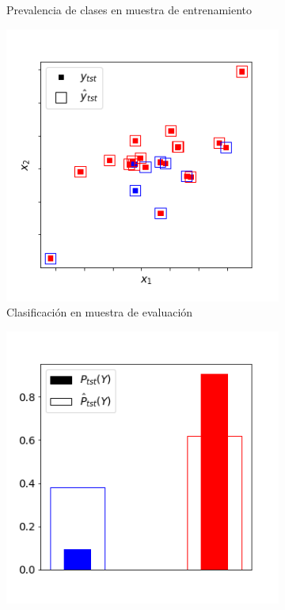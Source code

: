 \begin{figure}[h]
\begin{subfigure}[t]{0.4\textwidth}
        \caption{Prevalencia de clases en muestra de
        entrenamiento}\label{cambios:prevalencia_tr}
    \end{subfigure}
    \medskip
    \begin{subfigure}[t]{0.4\textwidth}
        \centering
        \includegraphics[width=\textwidth]{../plots_teoria/cambios_test_scatterplot.png}
        \caption{Clasificación en muestra de
        evaluación}\label{cambios:clasificacion_tst}
    \end{subfigure}
    \hfill
    \begin{subfigure}[t]{0.4\textwidth}
        \centering
        \includegraphics[width=\textwidth]{../plots_teoria/cambios_test_barplot.png}

\end{subfigure}
\end{figure}
